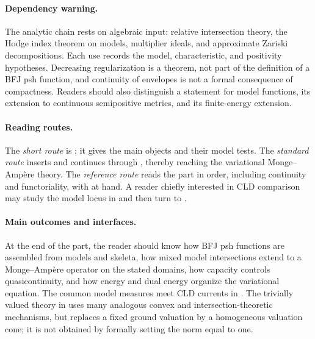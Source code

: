 \paragraph{Dependency warning.}
\label{front:part3-dependency-warning}
The analytic chain rests on algebraic input: relative intersection theory,
the Hodge index theorem on models, multiplier ideals, and approximate Zariski
decompositions.  Each use records the model, characteristic, and positivity
hypotheses.  Decreasing regularization is a theorem, not part of the
definition of a BFJ psh function, and continuity of envelopes is not a formal
consequence of compactness.  Readers should also distinguish a statement for
model functions, its extension to continuous semipositive metrics, and its
finite-energy extension.

\paragraph{Reading routes.}
\label{front:part3-reading-routes}
The \emph{short route} is
;
it gives the main objects and their model tests.  The \emph{standard route}
inserts
 and continues
through , thereby reaching the
variational Monge--Amp\`ere theory.  The \emph{reference route} reads the part
in order, including continuity and functoriality, with
 at hand.  A
reader chiefly interested in CLD comparison may study the model locus in
 and then turn to
.

\paragraph{Main outcomes and interfaces.}
\label{front:part3-main-outcomes-and-interfaces}
At the end of the part, the reader should know how BFJ psh functions are
assembled from models and skeleta, how mixed model intersections extend to a
Monge--Amp\`ere operator on the stated domains, how capacity controls
quasicontinuity, and how energy and dual energy organize the variational
equation.  The common model measures meet CLD currents in
.  The trivially valued theory in  uses
many analogous convex and intersection-theoretic mechanisms, but replaces a
fixed ground valuation by a homogeneous valuation cone; it is not obtained by
formally setting the norm equal to one.

